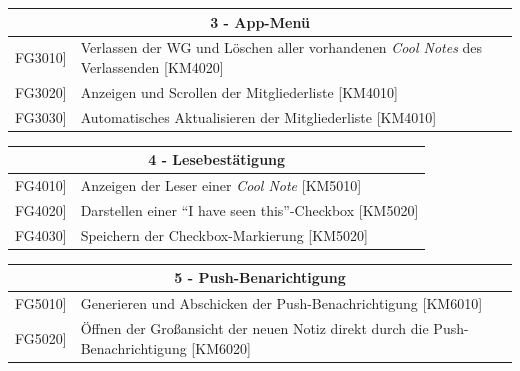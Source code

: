 \documentclass[a4paper]{scrreprt}
\begin{document}
    		\vspace{5mm}
    		
    		\begin{table}[h!]
    			\centering
    			\label{my-label}
    			\begin{tabular}{p{2cm}p{12cm}}
    				
    				\multicolumn{2}{c}{\textbf{3 - App-Menü}} \\ \hline
    				\centering{[}FG3010{]} & Verlassen der WG und Löschen aller vorhandenen \textit{Cool Notes} des Verlassenden {[}KM4020{]}\\
    				\centering{[}FG3020{]} & Anzeigen und Scrollen der Mitgliederliste {[}KM4010{]}\\
    				\centering{[}FG3030{]} & Automatisches Aktualisieren der Mitgliederliste {[}KM4010{]}\\
    				\hline
    			\end{tabular}
    		\end{table}
    		
    		\vspace{5mm}
    		
    		\begin{table}[h!]
    			\centering
    			\label{my-label}
    			\begin{tabular}{p{2cm}p{12cm}}
    				
    				\multicolumn{2}{c}{\textbf{4 - Lesebestätigung}} \\ \hline
    				\centering{[}FG4010{]} & Anzeigen der Leser einer \textit{Cool Note} {[}KM5010{]}\\
    				\centering{[}FG4020{]}& Darstellen einer ``I have seen this”-Checkbox {[}KM5020{]}                              \\
    				\centering{[}FG4030{]}& Speichern der Checkbox-Markierung {[}KM5020{]}\\ 
    				
    				\hline
    			\end{tabular}
    		\end{table}
    		
    		\vspace{5mm}
    		
    		\begin{table}[h!]
    			\centering
    			\label{my-label}
    			\begin{tabular}{p{2cm}p{12cm}}
    				
    				\multicolumn{2}{c}{\textbf{5 - Push-Benarichtigung}}\\ \hline
    				\centering{[}FG5010{]} & Generieren und Abschicken der Push-Benachrichtigung {[}KM6010{]}\\
    				\centering{[}FG5020{]}&Öffnen der Großansicht der neuen Notiz direkt durch die Push-Benachrichtigung {[}KM6020{]}           \\ 
    				
    				\hline
    			\end{tabular}
    		\end{table}
    		
\end{document}

